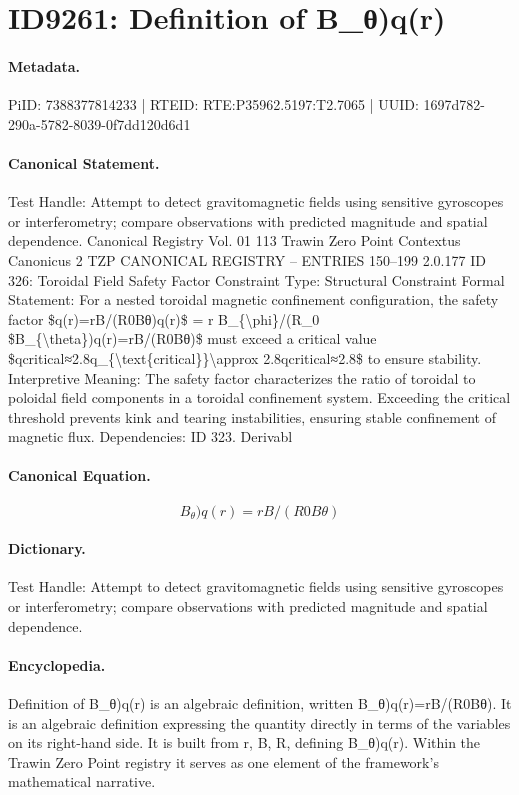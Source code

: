 \section*{ID9261: Definition of B\_θ)q(r)}
\paragraph{Metadata.}
PiID: 7388377814233 | RTEID: RTE:P35962.5197:T2.7065 | UUID: 1697d782-290a-5782-8039-0f7dd120d6d1

\paragraph{Canonical Statement.}
Test Handle: Attempt to detect gravitomagnetic fields using sensitive gyroscopes or interferometry; compare observations with predicted magnitude and spatial dependence. Canonical Registry Vol. 01 113 Trawin Zero Point Contextus Canonicus 2 TZP CANONICAL REGISTRY – ENTRIES 150–199 2.0.177 ID 326: Toroidal Field Safety Factor Constraint Type: Structural Constraint Formal Statement: For a nested toroidal magnetic confinement configuration, the safety factor \$q(r)=rB/(R0Bθ)q(r)\$ = r B\_\{\textbackslash{}phi\}/(R\_0 \$B\_\{\textbackslash{}theta\})q(r)=rB/(R0Bθ)\$ must exceed a critical value \$qcritical≈2.8q\_\{\textbackslash{}text\{critical\}\}\textbackslash{}approx 2.8qcritical≈2.8\$ to ensure stability. Interpretive Meaning: The safety factor characterizes the ratio of toroidal to poloidal field components in a toroidal confinement system. Exceeding the critical threshold prevents kink and tearing instabilities, ensuring stable confinement of magnetic flux. Dependencies: ID 323. Derivabl

\paragraph{Canonical Equation.}
\[
B_{\theta})q(r)=rB/(R0Bθ)
\]

\paragraph{Dictionary.}
Test Handle: Attempt to detect gravitomagnetic fields using sensitive gyroscopes or interferometry; compare observations with predicted magnitude and spatial dependence.

\paragraph{Encyclopedia.}
Definition of B\_θ)q(r) is an algebraic definition, written B\_θ)q(r)=rB/(R0Bθ). It is an algebraic definition expressing the quantity directly in terms of the variables on its right-hand side. It is built from r, B, R, defining B\_θ)q(r). Within the Trawin Zero Point registry it serves as one element of the framework's mathematical narrative.
